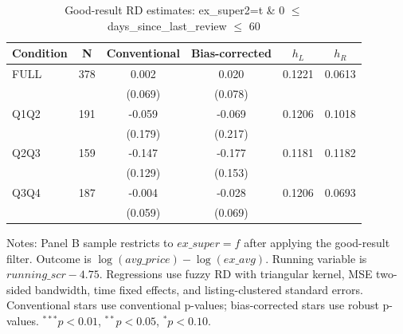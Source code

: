 \begin{table}[!htbp]
\centering
\caption{Good-result RD estimates: ex\_super2=t \& 0 $\leq$ days\_since\_last\_review $\leq$ 60}
\label{tab:good_result_days_since_last_review_60}
\begin{tabular}{lccccc}
\hline
Condition & N & Conventional & Bias-corrected & $h_L$ & $h_R$ \\
\hline
FULL & 378 & 0.002 & 0.020 & 0.1221 & 0.0613 \\
 &  & (0.069) & (0.078) &  &  \\
Q1Q2 & 191 & -0.059 & -0.069 & 0.1206 & 0.1018 \\
 &  & (0.179) & (0.217) &  &  \\
Q2Q3 & 159 & -0.147 & -0.177 & 0.1181 & 0.1182 \\
 &  & (0.129) & (0.153) &  &  \\
Q3Q4 & 187 & -0.004 & -0.028 & 0.1206 & 0.0693 \\
 &  & (0.059) & (0.069) &  &  \\
\hline
\end{tabular}
\begin{flushleft}
\footnotesize Notes: Panel B sample restricts to $ex\_super=f$ after applying the good-result filter. Outcome is $\log(avg\_price)-\log(ex\_avg)$. Running variable is $running\_scr-4.75$. Regressions use fuzzy RD with triangular kernel, MSE two-sided bandwidth, time fixed effects, and listing-clustered standard errors. Conventional stars use conventional p-values; bias-corrected stars use robust p-values. $^{***}p<0.01$, $^{**}p<0.05$, $^{*}p<0.10$.
\end{flushleft}
\end{table}

